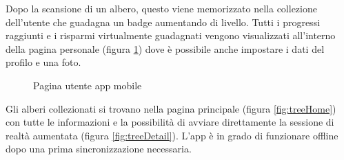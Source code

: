 Dopo la scansione di un albero, questo viene memorizzato nella collezione dell'utente che guadagna un badge aumentando di livello. Tutti i progressi raggiunti e i risparmi virtualmente guadagnati vengono visualizzati all'interno della pagina personale (figura \ref{fig:userPage}) dove è possibile anche impostare i dati del profilo e una foto.

\begin{figure}
    \centering
    \caption{Pagina utente app mobile}
    \label{fig:userPage}
\end{figure}

Gli alberi collezionati si trovano nella pagina principale (figura \ref{fig:treeHome}) con tutte le informazioni e la possibilità di avviare direttamente la sessione di realtà aumentata (figura \ref{fig:treeDetail}).
L'app è in grado di funzionare offline dopo una prima sincronizzazione necessaria.

